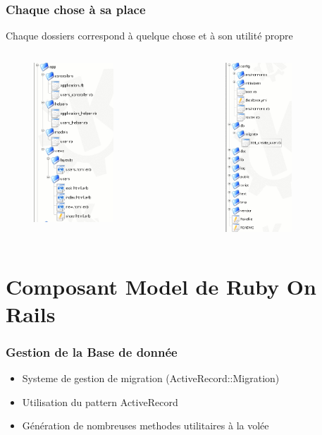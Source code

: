 \documentclass{beamer}
\begin{document}
\begin{frame}
    \frametitle{Chaque chose à sa place}
    Chaque dossiers correspond à quelque chose et à son utilité
            propre
    \begin{columns}
        \begin{column}[l]{4cm}
            \begin{figure}
                \includegraphics[width=30mm]{FS_1.png}
            \end{figure}
        \end{column}
        \begin{column}[r]{4cm}
            \begin{figure}
                \includegraphics[width=25mm]{FS_2.png}
            \end{figure}
        \end{column}
    \end{columns}
\end{frame}

\section{Composant Model de Ruby On Rails}

\begin{frame}
    \frametitle{Gestion de la Base de donnée}
    \begin{itemize}
        \item Systeme de gestion de migration (ActiveRecord::Migration)
        \item Utilisation du pattern ActiveRecord
        \item Génération de nombreuses methodes utilitaires à la volée
    \end{itemize}
\end{frame}
\end{document}
